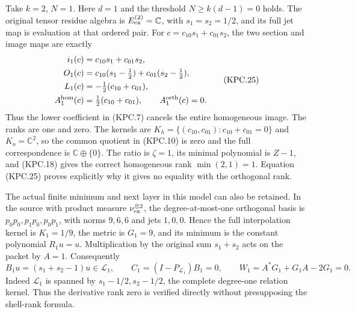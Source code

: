 Take \(k=2\), \(N=1\).  Here \(d=1\) and the
threshold \(N\ge k(d-1)=0\) holds.  The original tensor
residue algebra is \(E^{(2)}_{\rm ex}=\mathbb C\), with
\(s_1=s_2=1/2\), and its full jet map is evaluation at
that ordered pair.  For \(c=c_{10}s_1+c_{01}s_2\),
the two section and image maps are exactly
\[
 \begin{split}
 i_1(c)&=c_{10}s_1+c_{01}s_2,\\
 O_1(c)&=c_{10}(s_1-\tfrac12)+c_{01}(s_2-\tfrac12),\\
 L_1(c)&=-\tfrac12(c_{10}+c_{01}),\\
 A_1^{\rm hom}(c)&=\tfrac12(c_{10}+c_{01}),
       \qquad A_1^{\rm orth}(c)=0.
 \end{split}                                                    \tag{KPC.25}
\]
Thus the lower coefficient in (KPC.7) cancels the entire
homogeneous image.  The ranks are one and zero.  The kernels are
\(K_h=\{(c_{10},c_{01}):c_{10}+c_{01}=0\}\) and
\(K_o=\mathbb C^2\), so the common quotient in (KPC.10)
is zero and the full correspondence is \(\mathbb C\oplus\{0\}\).
The ratio is \(\zeta=1\), its minimal polynomial is
\(Z-1\), and (KPC.18) gives the correct homogeneous rank
\(\min(2,1)=1\).  Equation (KPC.25) proves explicitly
why it gives no equality with the orthogonal rank.

The actual finite minimum and next layer in this model can also
be retained.  In the source with product measure
\(\nu_{\rm ex}^{\otimes2}\), the degree-at-most-one
orthogonal basis is
\(p_0p_0,p_1p_0,p_0p_1\), with norms \(9,6,6\)
and jets \(1,0,0\).  Hence the full interpolation kernel
is \(K_1=1/9\), the metric is \(G_1=9\), and its
minimum is the constant polynomial \(R_1u=u\).
Multiplication by the original sum \(s_1+s_2\) acts on
the packet by \(A=1\).  Consequently
\[
 B_1u=(s_1+s_2-1)u\in\mathcal L_1,
 \qquad C_1=(I-P_{\mathcal L_1})B_1=0,\qquad
 W_1=A^*G_1+G_1A-2G_1=0.
 \tag{KPC.26}
\]
Indeed \(\mathcal L_1\) is spanned by
\(s_1-1/2,s_2-1/2\), the complete degree-one relation
kernel.  Thus the derivative rank zero is verified directly
without presupposing the shell-rank formula.

